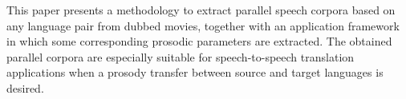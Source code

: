 This paper presents a methodology to extract parallel speech corpora based on any language pair from dubbed movies, together with an application framework in which some corresponding prosodic parameters are extracted. The obtained parallel corpora are especially suitable for speech-to-speech translation applications when a prosody transfer between source and target languages is desired.
